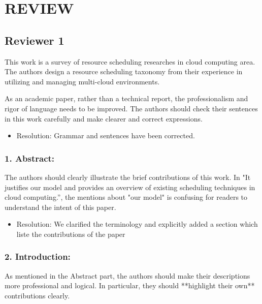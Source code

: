 \section {REVIEW}

\newcommand{\RESOLUTION}[1]{\color{red}\begin{itemize} \item Resolution: #1\end{itemize}\color{black}}

\newcommand{\OK}[1]{\color{blue}\begin{itemize} \item Resolution: #1\end{itemize}\color{black}}


\subsection{Reviewer 1}

This work is a survey of resource scheduling researches in cloud
computing area. The authors design a resource scheduling taxonomy from
their experience in utilizing and managing multi-cloud environments.


As an academic paper, rather than a technical report, the
professionalism and rigor of language needs to be improved. The
authors should check their sentences in this work carefully and make
clearer and correct expressions. 

\OK{Grammar and sentences have been corrected.}

\subsubsection{1. Abstract:}

The authors should clearly illustrate the brief
contributions of this work. In "It justifies our model and provides an
overview of existing scheduling techniques in cloud computing.”, the
mentions about "our model" is confusing for readers to understand the
intent of this paper.

\OK{ We clarified the terminology and explicitly added a section which
  liste the contributions of the paper}


\subsubsection{2. Introduction:}

As mentioned in the Abstract part, the authors should
make their descriptions more professional and logical. In particular,
they should **highlight their own** contributions clearly.

